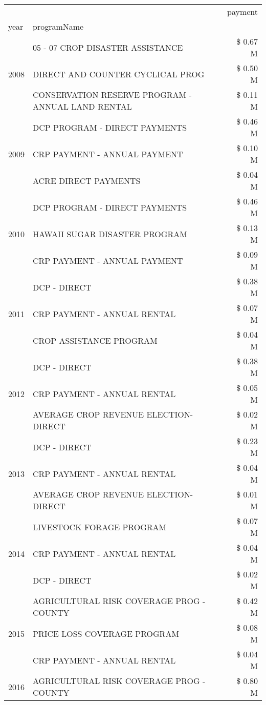 \begin{tabular}{llr}
\toprule
 &  & payment \\
year & programName &  \\
\midrule
\multirow[t]{3}{*}{2008} & 05 - 07 CROP DISASTER ASSISTANCE & \$ 0.67 M \\
 & DIRECT AND COUNTER CYCLICAL PROG & \$ 0.50 M \\
 & CONSERVATION RESERVE PROGRAM - ANNUAL LAND RENTAL & \$ 0.11 M \\
\cline{1-3}
\multirow[t]{3}{*}{2009} & DCP PROGRAM - DIRECT PAYMENTS & \$ 0.46 M \\
 & CRP PAYMENT - ANNUAL PAYMENT & \$ 0.10 M \\
 & ACRE DIRECT PAYMENTS & \$ 0.04 M \\
\cline{1-3}
\multirow[t]{3}{*}{2010} & DCP PROGRAM - DIRECT PAYMENTS & \$ 0.46 M \\
 & HAWAII SUGAR DISASTER PROGRAM & \$ 0.13 M \\
 & CRP PAYMENT - ANNUAL PAYMENT & \$ 0.09 M \\
\cline{1-3}
\multirow[t]{3}{*}{2011} & DCP - DIRECT & \$ 0.38 M \\
 & CRP PAYMENT - ANNUAL RENTAL & \$ 0.07 M \\
 & CROP ASSISTANCE PROGRAM & \$ 0.04 M \\
\cline{1-3}
\multirow[t]{3}{*}{2012} & DCP - DIRECT & \$ 0.38 M \\
 & CRP PAYMENT - ANNUAL RENTAL & \$ 0.05 M \\
 & AVERAGE CROP REVENUE ELECTION-DIRECT & \$ 0.02 M \\
\cline{1-3}
\multirow[t]{3}{*}{2013} & DCP - DIRECT & \$ 0.23 M \\
 & CRP PAYMENT - ANNUAL RENTAL & \$ 0.04 M \\
 & AVERAGE CROP REVENUE ELECTION-DIRECT & \$ 0.01 M \\
\cline{1-3}
\multirow[t]{3}{*}{2014} & LIVESTOCK FORAGE PROGRAM & \$ 0.07 M \\
 & CRP PAYMENT - ANNUAL RENTAL & \$ 0.04 M \\
 & DCP - DIRECT & \$ 0.02 M \\
\cline{1-3}
\multirow[t]{3}{*}{2015} & AGRICULTURAL RISK COVERAGE PROG - COUNTY & \$ 0.42 M \\
 & PRICE LOSS COVERAGE PROGRAM & \$ 0.08 M \\
 & CRP PAYMENT - ANNUAL RENTAL & \$ 0.04 M \\
\cline{1-3}
\multirow[t]{3}{*}{2016} & AGRICULTURAL RISK COVERAGE PROG - COUNTY & \$ 0.80 M \\

\end{tabular}
